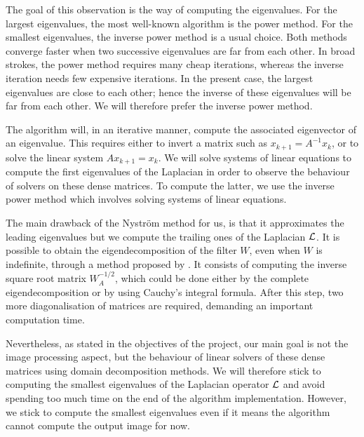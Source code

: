 \ifthesis
 The goal of this observation is the way of computing the eigenvalues.
 For the largest eigenvalues, the most well-known algorithm is the power method.
 For the smallest eigenvalues, the inverse power method is a usual choice.
 Both methods converge faster when two successive eigenvalues are far from each other.
 In broad strokes, the power method requires many cheap iterations, whereas the inverse iteration needs few expensive iterations.
 In the present case, the largest eigenvalues are close to each other; hence the inverse of these eigenvalues will be far from each other.
 We will therefore prefer the inverse power method.

 The algorithm will, in an iterative manner, compute the associated eigenvector of an eigenvalue.
 This requires either to invert a matrix such as \(x_{k+1} = A^{-1} x_k\), or to solve the linear system \(A x_{k+1} = x_k\).
 We will solve systems of linear equations to compute the first eigenvalues of the Laplacian in order to observe the behaviour of solvers on these dense matrices.
\else
 To compute the latter, we use the inverse power method which involves solving systems of linear equations.
\fi

The main drawback of the Nystr\"om method for us, is that it approximates the leading eigenvalues but we compute the trailing ones of the Laplacian \(\operatorname{\mathcal{L}}\)\ifthesis \cite{belongie_spectral_2002}\fi.
\ifthesis
 It is possible to obtain the eigendecomposition of the filter \(W\), even when \(W\) is indefinite, through a method proposed by \cite{fowlkes_spectral_2004}.
 It consists of computing the inverse square root matrix \(W_A^{-1/2}\), which could be done either by the complete eigendecomposition or by using Cauchy's integral formula.
 After this step, two more diagonalisation of matrices are required, demanding an important computation time.

 Nevertheless, as stated in the objectives of the project, our main goal is not the image processing aspect, but the behaviour of linear solvers of these dense matrices using domain decomposition methods.
 We will therefore stick to computing the smallest eigenvalues of the Laplacian operator \(\operatorname{\mathcal{L}}\) and avoid spending too much time on the end of the algorithm implementation.
\else
 However, we stick to compute the smallest eigenvalues even if it means the algorithm cannot compute the output image for now.
\fi
